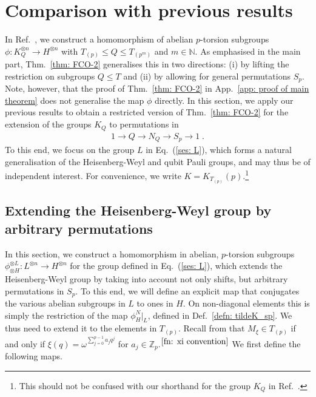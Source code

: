 \documentclass[aps,pra,letterpaper,onrcolumn,nofootinbib,notitlepage,longbibliography]{revtex4-1}
\newcommand{\mf}[1]{#1}
\newcommand{\ra}{\ensuremath{\rightarrow}}
\newcommand{\Z}{\mathbb Z}
\begin{document}
\section{Comparison with previous results}\label{app: comparison}

In Ref.~\cite{FrembsChungOkay2022}, we construct a homomorphism of abelian $p$-torsion subgroups $\phi:K^{\otimes n}_Q\ra H^{\otimes n}$ with $T_{(p)}\leq Q\leq T_{(p^m)}$ and $m\in\mathbb{N}$. As emphasised in the main part, Thm.~\ref{thm: FCO-2} generalises this in two directions: (i) by lifting the restriction on subgroups $Q\leq T$ and (ii) by allowing for general permutations $S_p$. Note, however, that the proof of Thm.~\ref{thm: FCO-2} in App.~\ref{app: proof of main theorem} does not generalise the map $\phi$ directly. In this section, we apply our previous results to obtain a restricted version of Thm.~\ref{thm: FCO-2} for the extension of the groups $K_Q$ to permutations in
\begin{align*}
    1 \ra Q \ra N_Q \ra S_p \ra 1\; .
\end{align*}
To this end, we focus on the group $L$ in Eq.~(\ref{ses: L}), which forms a natural generalisation of the Heisenberg-Weyl and qubit Pauli groups, and may thus be of independent interest. For convenience, we write $K=K_{T_{(p)}}(p)$.\footnote{This should not be confused with our shorthand for the group $K_Q$ in Ref.~\cite{FrembsChungOkay2022}.}



\subsection{Extending the Heisenberg-Weyl group by arbitrary permutations}

In this section, we construct a homomorphism in abelian, $p$-torsion subgroups $\phi^{\otimes L}_{\otimes H}:L^{\otimes n}\ra H^{\otimes n}$ for the group defined in Eq.~(\ref{ses: L}), which extends the Heisenberg-Weyl group by taking into account not only shifts, but arbitrary permutations in $S_p$. To this end, we will define an explicit map that conjugates the various abelian subgroups in $L$ to ones in $H$. On non-diagonal elements this is simply the restriction of the map $\phi^N_H|_L$, defined in Def.~\ref{defn: tildeK_sp}. We thus need to extend it to the elements in $T_{(p)}$. Recall from \cite[Theorem 3]{FrembsChungOkay2022} that $M_\xi\in T_{(p)}$ if and only if \mf{$\xi(q)=\omega^{\sum_{j=0}^{p-1} a_jq^j}$} for $a_j\in\Z_p$.$^{\ref{fn: xi convention}}$ We first define the following maps.
\end{document}
